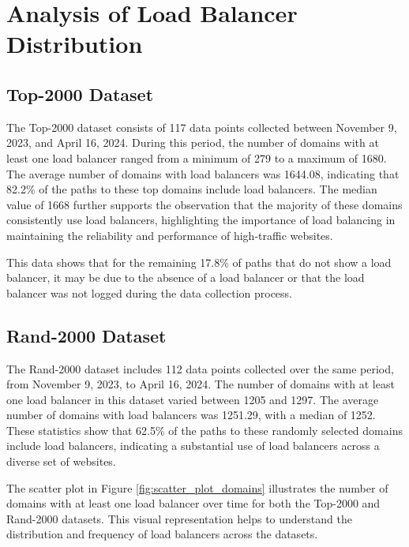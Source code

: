 \documentclass[12pt]{cwru_thesis}
\begin{document}
\section{Analysis of Load Balancer Distribution}

\subsection{Top-2000 Dataset}

The Top-2000 dataset consists of 117 data points collected between November 9, 2023, and April 16, 2024. During this period, the number of domains with at least one load balancer ranged from a minimum of 279 to a maximum of 1680. The average number of domains with load balancers was 1644.08, indicating that 82.2\% of the paths to these top domains include load balancers. The median value of 1668 further supports the observation that the majority of these domains consistently use load balancers, highlighting the importance of load balancing in maintaining the reliability and performance of high-traffic websites.

This data shows that for the remaining 17.8\% of paths that do not show a load balancer, it may be due to the absence of a load balancer or that the load balancer was not logged during the data collection process.



\subsection{Rand-2000 Dataset}

The Rand-2000 dataset includes 112 data points collected over the same period, from November 9, 2023, to April 16, 2024. The number of domains with at least one load balancer in this dataset varied between 1205 and 1297. The average number of domains with load balancers was 1251.29, with a median of 1252. These statistics show that 62.5\% of the paths to these randomly selected domains include load balancers, indicating a substantial use of load balancers across a diverse set of websites.


The scatter plot in Figure \ref{fig:scatter_plot_domains} illustrates the number of domains with at least one load balancer over time for both the Top-2000 and Rand-2000 datasets. 
This visual representation helps to understand the distribution and frequency of load balancers across the datasets.
\end{document}
